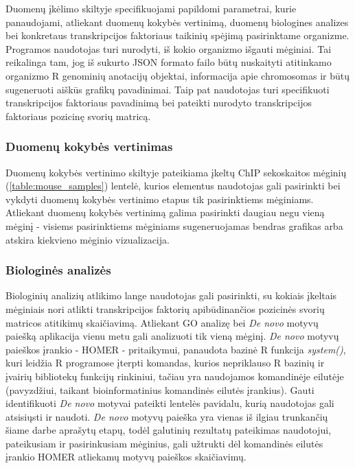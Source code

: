 \documentclass[12pt]{article}
\begin{document}
Duomenų įkėlimo skiltyje specifikuojami papildomi parametrai, kurie panaudojami,
atliekant duomenų kokybės vertinimą, duomenų biologines analizes bei konkretaus
transkripcijos faktoriaus taikinių spėjimą pasirinktame organizme. Programos
naudotojas turi nurodyti, iš kokio organizmo išgauti mėginiai. Tai reikalinga
tam, jog iš sukurto JSON \cite{JSON} formato failo būtų nuskaityti atitinkamo
organizmo R genominių anotacijų objektai, informacija apie chromosomas ir būtų
sugeneruoti aiškūs grafikų pavadinimai. Taip pat naudotojas turi specifikuoti
transkripcijos faktoriaus pavadinimą bei pateikti nurodyto transkripcijos
faktoriaus pozicinę svorių matricą.

\subsubsection*{Duomenų kokybės vertinimas}
Duomenų kokybės vertinimo skiltyje pateikiama įkeltų ChIP sekoskaitos mėginių
(\ref{table:mouse_samples}) lentelė, kurios elementus naudotojas gali
pasirinkti bei vykdyti duomenų kokybės vertinimo etapus tik pasirinktiems
mėginiams. Atliekant duomenų kokybės vertinimą galima pasirinkti daugiau negu
vieną mėginį - visiems pasirinktiems mėginiams sugeneruojamas bendras grafikas
arba atskira kiekvieno mėginio vizualizacija.

\subsubsection*{Biologinės analizės}
Biologinių analizių atlikimo lange naudotojas gali pasirinkti, su kokiais
įkeltais mėginiais nori atlikti transkripcijos faktorių apibūdinančios pozicinės
svorių matricos atitikimų skaičiavimą. Atliekant GO analizę bei \emph{De novo}
motyvų paiešką aplikacija vienu metu gali analizuoti tik vieną mėginį.
\emph{De novo} motyvų paieškos įrankio - HOMER - pritaikymui, panaudota bazinė R
funkcija \emph{system()}, kuri leidžia R programose įterpti komandas, kurios
nepriklauso R bazinių ir įvairių bibliotekų funkcijų rinkiniui, tačiau yra
naudojamos komandinėje eilutėje (pavyzdžiui, taikant bioinformatinius komandinės
eilutės įrankius). Gauti identifikuoti \emph{De novo} motyvai pateikti
lentelės pavidalu, kurią naudotojas gali atsisiųsti ir naudoti. \emph{De novo}
motyvų paieška yra vienas iš ilgiau trunkančių šiame darbe aprašytų etapų, todėl
galutinių rezultatų pateikimas naudotojui, pateikusiam ir pasirinkusiam
mėginius, gali užtrukti dėl komandinės eilutės įrankio HOMER atliekamų motyvų
paieškos skaičiavimų.  
\end{document}
